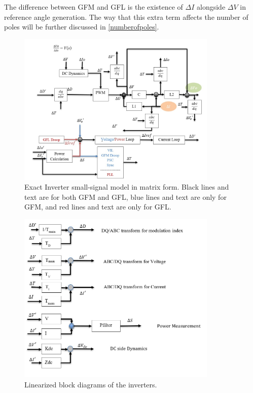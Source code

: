   The difference between GFM and GFL is the existence of $\Delta I$ alongside $\Delta V$ in reference angle generation. The way that this extra term affects the number of poles will be further discussed in \ref{numberofpoles}.

\begin{figure}[ht]
    \centering
	\includegraphics[width=0.85\textwidth]{figures/Inverter Model.jpg}
	\caption[Exact Inverter Models]{Exact Inverter small-signal model in matrix form. Black lines and text are for both GFM and GFL, blue lines and text are only for GFM, and red lines and text are only for GFL.}
	\label{fig:model}
\end{figure}

\begin{figure}[ht]
    \centering
	\includegraphics[width=0.85\textwidth]{figures/Inverter lin.jpg}
	\caption[Liniearized Block Diagrams]{Linearized block diagrams of the inverters.}
	\label{fig:lin}
\end{figure}
